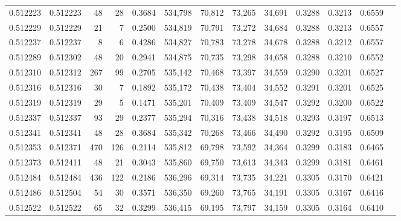 \begin{tabular}{rrrrrrrrrrrrr}
0.512223 & 0.512223 &    48 &    28 &                                     0.3684 & 534,798 &  70,812 &  73,265 &  34,691 & 0.3288 & 0.3213 & 0.6559 \\
0.512229 & 0.512229 &    21 &     7 &                                     0.2500 & 534,819 &  70,791 &  73,272 &  34,684 & 0.3288 & 0.3213 & 0.6557 \\
0.512237 & 0.512237 &     8 &     6 &                                     0.4286 & 534,827 &  70,783 &  73,278 &  34,678 & 0.3288 & 0.3212 & 0.6557 \\
0.512289 & 0.512302 &    48 &    20 &                                     0.2941 & 534,875 &  70,735 &  73,298 &  34,658 & 0.3288 & 0.3210 & 0.6552 \\
0.512310 & 0.512312 &   267 &    99 &                                     0.2705 & 535,142 &  70,468 &  73,397 &  34,559 & 0.3290 & 0.3201 & 0.6527 \\
0.512316 & 0.512316 &    30 &     7 &                                     0.1892 & 535,172 &  70,438 &  73,404 &  34,552 & 0.3291 & 0.3201 & 0.6525 \\
0.512319 & 0.512319 &    29 &     5 &                                     0.1471 & 535,201 &  70,409 &  73,409 &  34,547 & 0.3292 & 0.3200 & 0.6522 \\
0.512337 & 0.512337 &    93 &    29 &                                     0.2377 & 535,294 &  70,316 &  73,438 &  34,518 & 0.3293 & 0.3197 & 0.6513 \\
0.512341 & 0.512341 &    48 &    28 &                                     0.3684 & 535,342 &  70,268 &  73,466 &  34,490 & 0.3292 & 0.3195 & 0.6509 \\
0.512353 & 0.512371 &   470 &   126 &                                     0.2114 & 535,812 &  69,798 &  73,592 &  34,364 & 0.3299 & 0.3183 & 0.6465 \\
0.512373 & 0.512411 &    48 &    21 &                                     0.3043 & 535,860 &  69,750 &  73,613 &  34,343 & 0.3299 & 0.3181 & 0.6461 \\
0.512484 & 0.512484 &   436 &   122 &                                     0.2186 & 536,296 &  69,314 &  73,735 &  34,221 & 0.3305 & 0.3170 & 0.6421 \\
0.512486 & 0.512504 &    54 &    30 &                                     0.3571 & 536,350 &  69,260 &  73,765 &  34,191 & 0.3305 & 0.3167 & 0.6416 \\
0.512522 & 0.512522 &    65 &    32 &                                     0.3299 & 536,415 &  69,195 &  73,797 &  34,159 & 0.3305 & 0.3164 & 0.6410 \\

\end{tabular}
